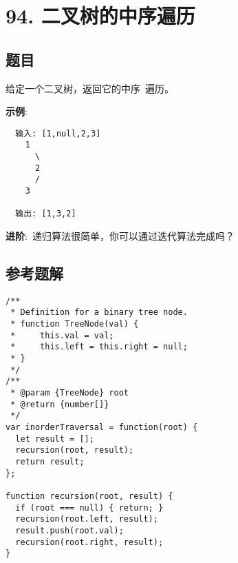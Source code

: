 \newpage
\section{94. 二叉树的中序遍历}
\label{leetcode:94}

\subsection{题目}

给定一个二叉树，返回它的中序 遍历。

\textbf{示例}:

\begin{verbatim}
  输入: [1,null,2,3]
    1
      \
      2
      /
    3

  输出: [1,3,2]
\end{verbatim}

\textbf{进阶}: 递归算法很简单，你可以通过迭代算法完成吗？

\subsection{参考题解}

\begin{verbatim}
/**
 * Definition for a binary tree node.
 * function TreeNode(val) {
 *     this.val = val;
 *     this.left = this.right = null;
 * }
 */
/**
 * @param {TreeNode} root
 * @return {number[]}
 */
var inorderTraversal = function(root) {
  let result = [];
  recursion(root, result);
  return result;
};

function recursion(root, result) {
  if (root === null) { return; }
  recursion(root.left, result);
  result.push(root.val);
  recursion(root.right, result);
}
\end{verbatim}